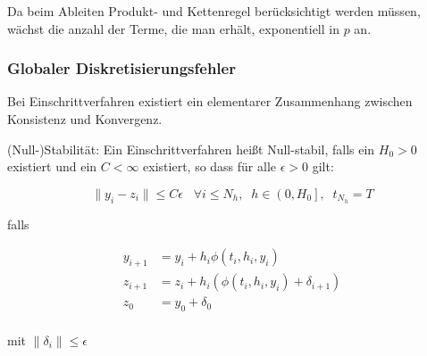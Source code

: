 Da beim Ableiten Produkt- und Kettenregel berücksichtigt werden müssen, wächst die anzahl der Terme, die man erhält, exponentiell in $p$ an.

\subsubsection{Globaler Diskretisierungsfehler}

Bei Einschrittverfahren existiert ein elementarer Zusammenhang zwischen Konsistenz und Konvergenz.

\begin{definition}[Definition IV.5] (Null-)Stabilität: Ein Einschrittverfahren heißt Null-stabil, falls ein $H_0 > 0$ existiert und ein $C < \infty$ existiert, so dass für alle $\epsilon > 0$ gilt:

	$$\|y_i - z_i\| \le C \epsilon \;\;\;\forall i \le N_h,\;\;h \in \left(0,H_0\right],\;\;t_{N_h} = T$$

	falls
	
	\begin{align*}
		y_{i+1} &= y_i + h_i \phi (t_i, h_i, y_i) \\
		z_{i+1} &= z_i + h_i (\phi (t_i, h_i, y_i) + \delta_{i+1}) \\
		z_0 &= y_0 + \delta_0 \\
	\end{align*}
	
	mit $\|\delta_i\| \le \epsilon$

\end{definition}